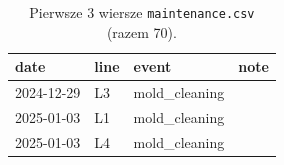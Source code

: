\begin{table}[H]\centering\footnotesize\ttfamily
\begin{tabular}{@{}llll@{}}\toprule
date & line & event & note \\\midrule
2024-12-29 & L3 & mold\_cleaning &  \\
2025-01-03 & L1 & mold\_cleaning &  \\
2025-01-03 & L4 & mold\_cleaning &  \\
\bottomrule\end{tabular}
\caption{Pierwsze 3 wiersze \texttt{maintenance.csv} (razem 70).}
\end{table}
